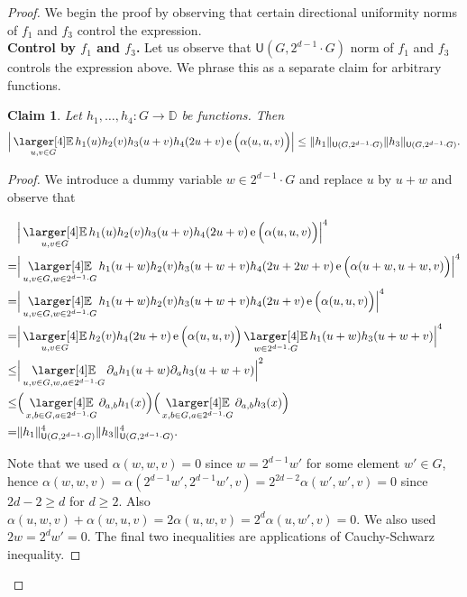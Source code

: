 \documentclass[a4paper,11pt]{article}
\numberwithin{theorem}{section}
\newtheorem{claim}[theorem]{Claim}
\theoremstyle{definition}
\newcommand{\on}[1]{
	\operatorname{#1}
}
\newcommand{\exx}{
  \mathop{
    \mathchoice{\vcenter{\hbox{\larger[4]$\mathbb{E}$}}}
               {\kern0pt\mathbb{E}}
               {\kern0pt\mathbb{E}}
               {\kern0pt\mathbb{E}}
  }\displaylimits
}
\begin{document}
\begin{proof}
We begin the proof by observing that certain directional uniformity norms of $f_1$ and $f_3$ control the expression.\\

\noindent\textbf{Control by $f_1$ and $f_3$.} Let us observe that $\mathsf{U}(G, 2^{d-1}\cdot G)$ norm of $f_1$ and $f_3$ controls the expression above. We phrase this as a separate claim for arbitrary functions.
    
    \begin{claim}
        Let $h_1, \dots, h_4 : G \to \mathbb{D}$ be functions. Then
         \[\Big|\exx_{u , v \in G} h_1(u) h_2(v) h_3(u + v) h_4(2u + v) \on{e}\Big(\alpha(u,u, v)\Big)\Big| \leq \|h_1\|_{\mathsf{U}(G, 2^{d-1}\cdot G)}\|h_3\|_{\mathsf{U}(G, 2^{d-1}\cdot G)}.\]
    \end{claim}

    \begin{proof}
    We introduce a dummy variable $w \in 2^{d-1} \cdot G$ and replace $u$ by $u + w$ and observe that 

    \begin{align*}
        &\Big|\exx_{u , v \in G} h_1(u) h_2(v) h_3(u + v) h_4(2u + v) \on{e}\Big(\alpha(u,u, v)\Big)\Big|^4 \\
        = &\Big|\exx_{u , v \in G, w \in 2^{d-1} \cdot G} h_1(u + w) h_2(v) h_3(u + w + v) h_4(2u + 2w + v) \on{e}\Big(\alpha(u + w,u + w, v)\Big)\Big|^4 \\
        = &\Big|\exx_{u , v \in G, w \in 2^{d-1} \cdot G} h_1(u + w) h_2(v) h_3(u + w + v) h_4(2u + v) \on{e}\Big(\alpha(u,u, v)\Big)\Big|^4\\
        = &\Big|\exx_{u , v \in G}  h_2(v)  h_4(2u + v) \on{e}\Big(\alpha(u,u, v)\Big) \exx_{w \in 2^{d-1} \cdot G} h_1(u + w)h_3(u + w + v)\Big|^4\\
        \leq &\Big| \exx_{u , v \in G, w, a \in 2^{d-1} \cdot G} \partial_a h_1(u + w) \partial_a h_3(u + w + v) \Big|^2\\
        \leq & \Big(\exx_{x, b \in G, a \in 2^{d-1} \cdot G} \partial_{a,b} h_1(x)\Big) \Big(\exx_{x, b \in G, a \in 2^{d-1} \cdot G} \partial_{a,b} h_3(x)\Big)\\
        = & \|h_1\|_{\mathsf{U}(G, 2^{d-1}\cdot G)}^4\|h_3\|_{\mathsf{U}(G, 2^{d-1}\cdot G)}^4.
    \end{align*}

    Note that we used $\alpha(w,w, v) = 0$ since $w = 2^{d-1} w'$ for some element $w' \in G$, hence $\alpha(w,w, v) = \alpha(2^{d-1} w', 2^{d-1} w', v) = 2^{2d - 2} \alpha(w',w', v) = 0$ since $2d - 2 \geq d$ for $d \geq 2$. Also $\alpha(u,w,v) + \alpha(w, u, v) = 2\alpha(u, w, v) = 2^d \alpha(u, w', v) = 0$. We also used $2w = 2^d w' = 0$. The final two inequalities are applications of Cauchy-Schwarz inequality.\end{proof}


\end{proof}
\end{document}
